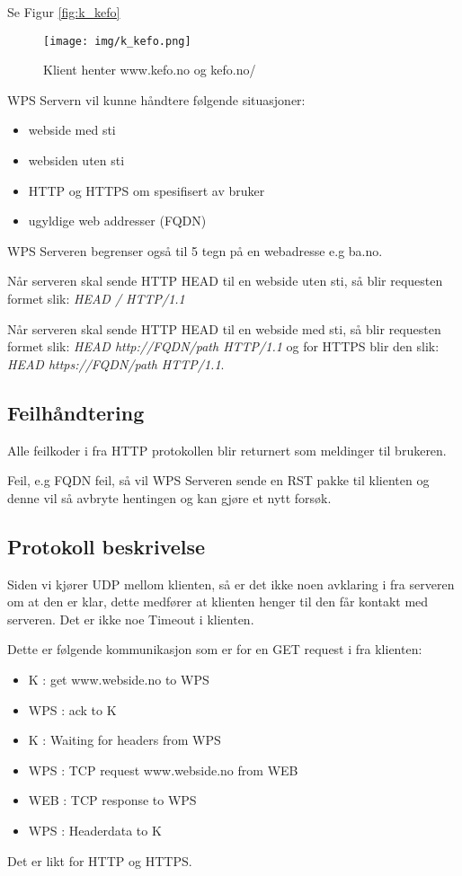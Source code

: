 \documentclass[norsk,a4paper]{article}
\begin{document}
Se Figur \eqref{fig:k_kefo}

\begin{figure}[ht!]
  \texttt{[image: img/k\_kefo.png]}
  \caption{Klient henter www.kefo.no og kefo.no/}
  \label{fig:k_kefo}
\end{figure}

WPS Servern vil kunne håndtere følgende situasjoner:
\begin{itemize}
  \item webside med sti
  \item websiden uten sti
  \item HTTP og HTTPS om spesifisert av bruker
  \item ugyldige web addresser (FQDN)
\end{itemize}

WPS Serveren begrenser også til 5 tegn på en webadresse e.g ba.no.

Når serveren skal sende HTTP HEAD til en webside uten sti,
så blir requesten formet slik: \textit{HEAD / HTTP/1.1}

Når serveren skal sende HTTP HEAD til en webside med sti,
så blir requesten formet slik: \textit{HEAD http://FQDN/path HTTP/1.1}
og for HTTPS blir den slik: \textit{HEAD https://FQDN/path HTTP/1.1}.

\clearpage
\subsection{Feilhåndtering}

Alle feilkoder i fra HTTP protokollen blir returnert som meldinger til brukeren.

Feil, e.g FQDN feil, så vil WPS Serveren sende en RST pakke til klienten og denne vil så avbryte hentingen og kan gjøre et nytt forsøk.

\subsection{Protokoll beskrivelse}

Siden vi kjører UDP mellom klienten,
så er det ikke noen avklaring i fra serveren om at den er klar, dette medfører at klienten henger til den får kontakt med serveren.
Det er ikke noe Timeout i klienten.

Dette er følgende kommunikasjon som er for en GET request i fra klienten:
\begin{itemize}
  \item K   : get www.webside.no to WPS
  \item WPS : ack to K
  \item K   : Waiting for headers from WPS
  \item WPS : TCP request www.webside.no from WEB
  \item WEB : TCP response to WPS
  \item WPS : Headerdata to K
\end{itemize}
Det er likt for HTTP og HTTPS.
\end{document}
